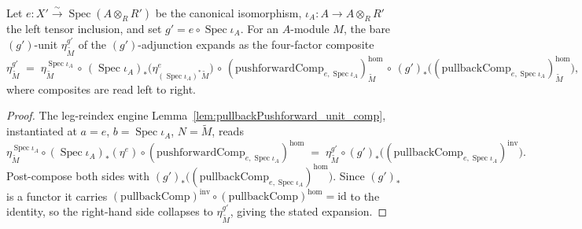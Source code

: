 \begin{lemma}

  \label{lem:base_change_mate_fstar_reindex_legs_unitExpand}
  Let \(e : X' \xrightarrow{\sim} \operatorname{Spec}(A \otimes_R R')\) be the canonical
  isomorphism, \(\iota_A : A \to A \otimes_R R'\) the left tensor inclusion, and set
  \(g' = e \circ \operatorname{Spec}\iota_A\). For an \(A\)-module \(M\), the bare \((g')\)-unit
  \(\eta^{g'}_{\widetilde M}\) of the \((g')\)-adjunction expands as the four-factor composite
  \[
    \eta^{g'}_{\widetilde M}
      \;=\;
      \eta^{\operatorname{Spec}\iota_A}_{\widetilde M}
      \,\circ\, (\operatorname{Spec}\iota_A)_{*}\bigl(\eta^{e}_{(\operatorname{Spec}\iota_A)^{*}\widetilde M}\bigr)
      \,\circ\, (\mathrm{pushforwardComp}_{e,\operatorname{Spec}\iota_A})^{\mathrm{hom}}_{\widetilde M}
      \,\circ\, (g')_{*}\bigl((\mathrm{pullbackComp}_{e,\operatorname{Spec}\iota_A})^{\mathrm{hom}}_{\widetilde M}\bigr),
  \]
  where composites are read left to right.
\end{lemma}
\begin{proof}
  The leg-reindex engine Lemma~\ref{lem:pullbackPushforward_unit_comp}, instantiated at \(a = e\),
  \(b = \operatorname{Spec}\iota_A\), \(N = \widetilde M\), reads
  \[
    \eta^{\operatorname{Spec}\iota_A}_{\widetilde M}
      \circ (\operatorname{Spec}\iota_A)_{*}(\eta^{e})
      \circ (\mathrm{pushforwardComp}_{e,\operatorname{Spec}\iota_A})^{\mathrm{hom}}
    \;=\;
    \eta^{g'}_{\widetilde M}
      \circ (g')_{*}\bigl((\mathrm{pullbackComp}_{e,\operatorname{Spec}\iota_A})^{\mathrm{inv}}\bigr).
  \]
  Post-compose both sides with \((g')_{*}\bigl((\mathrm{pullbackComp}_{e,\operatorname{Spec}\iota_A})^{\mathrm{hom}}\bigr)\).
  Since \((g')_{*}\) is a functor it carries
  \((\mathrm{pullbackComp})^{\mathrm{inv}} \circ (\mathrm{pullbackComp})^{\mathrm{hom}} = \mathrm{id}\)
  to the identity, so the right-hand side collapses to \(\eta^{g'}_{\widetilde M}\), giving the stated
  expansion.
\end{proof}

